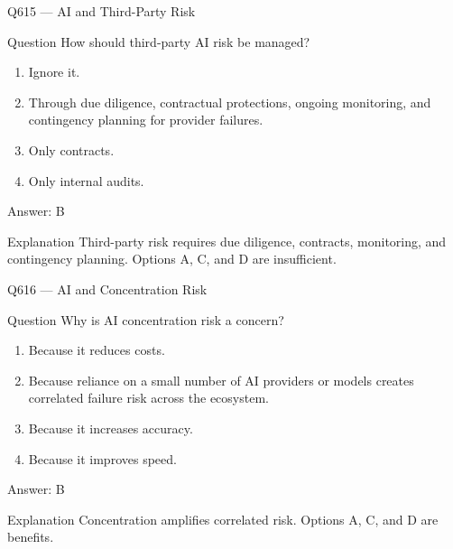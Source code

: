 \documentclass[aspectratio=169,8pt]{beamer}
\begin{document}
	\begin{frame}{Q615 --- AI and Third-Party Risk}
		\begin{block}{Question}
			How should third-party AI risk be managed?
			\begin{enumerate}
				\item Ignore it.
				\item Through due diligence, contractual protections, ongoing monitoring, and contingency planning for provider failures.
				\item Only contracts.
				\item Only internal audits.
			\end{enumerate}
		\end{block}
		\begin{exampleblock}{Answer: B}\end{exampleblock}
		\begin{block}{Explanation}
			Third-party risk requires due diligence, contracts, monitoring, and contingency planning. Options A, C, and D are insufficient.
		\end{block}
	\end{frame}
	
	\begin{frame}{Q616 --- AI and Concentration Risk}
		\begin{block}{Question}
			Why is AI concentration risk a concern?
			\begin{enumerate}
				\item Because it reduces costs.
				\item Because reliance on a small number of AI providers or models creates correlated failure risk across the ecosystem.
				\item Because it increases accuracy.
				\item Because it improves speed.
			\end{enumerate}
		\end{block}
		\begin{exampleblock}{Answer: B}\end{exampleblock}
		\begin{block}{Explanation}
			Concentration amplifies correlated risk. Options A, C, and D are benefits.
		\end{block}
	\end{frame}
	
\end{document}
